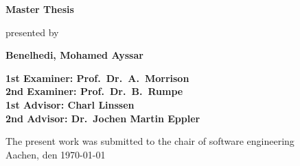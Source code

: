 \begin{titlepage}
\begin{flushleft}
{    {\Large \textbf{Master Thesis}\\}
		\vspace{3em} 
		
		{\large presented by\\} %
    
    {\LARGE \textbf{Benelhedi, Mohamed Ayssar}\\}
    \vspace{3em} 
		    
  {\Large \textbf{1st Examiner: Prof.\ Dr.\ A.\ Morrison}\\}
    \vspace{1em} 
    {\Large \textbf{2nd Examiner: Prof.\ Dr.\ B.\ Rumpe}\\}
    \vspace{1em} 
    {\Large \textbf{1st Advisor: Charl Linssen}\\}
    \vspace{1em} 
    {\Large \textbf{2nd Advisor: Dr.\ Jochen Martin Eppler}\\}
    \vspace{7em} 
    
    
   
    
    
    \vspace{7em}

    {\large The present work was submitted to the chair of software engineering \\}
    \vspace{1em}
		{\large	Aachen, den \today\\}
  }
\end{flushleft}

\end{titlepage}





